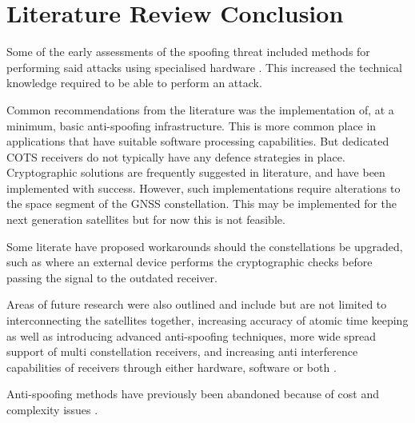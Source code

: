 \section{Literature Review Conclusion}
Some of the early assessments of the spoofing threat included methods for performing said attacks using specialised hardware \cite{RN23}. This increased the technical
knowledge required to be able to perform an attack.

Common recommendations from the literature was the implementation of, at a minimum, basic anti-spoofing infrastructure. This is more common place in applications that
have suitable software processing capabilities. But dedicated COTS receivers do not typically have any defence strategies in place.
Cryptographic solutions are frequently suggested in literature, and have been implemented with success. However, such implementations require alterations to the space
segment of the GNSS constellation. This may be implemented for the next generation satellites but for now this is not feasible. 

Some literate have proposed workarounds should the constellations be upgraded, such as \cite{RN19} where an external device performs the cryptographic checks before
passing the signal to the outdated receiver.

Areas of future research were also outlined and include but are not limited to interconnecting the satellites together, increasing accuracy of
atomic time keeping as well as introducing advanced anti-spoofing techniques, more wide spread support of multi constellation receivers, and increasing anti interference
capabilities of receivers through either hardware, software or both \cite{RN33}.

Anti-spoofing methods have previously been abandoned because of cost and complexity issues \cite{RN7}.